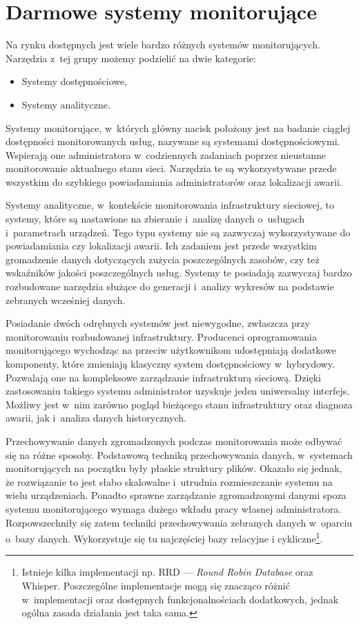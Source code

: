 \chapter{Darmowe systemy monitorujące}
\label{chap:Systemy}

Na rynku dostępnych jest wiele bardzo różnych systemów
monitorujących. Narzędzia z~tej grupy możemy podzielić na dwie
kategorie:

\begin{itemize}
\item Systemy dostępnościowe,
\item Systemy analityczne.
\end{itemize}

Systemy monitorujące, w~których główny nacisk położony jest na badanie
ciągłej dostępności monitorowanych usług, nazywane są systemami
dostępnościowymi. Wspierają one administratora w~codziennych zadaniach
poprzez nieustanne monitorowanie aktualnego stanu sieci. Narzędzia te
są wykorzystywane przede wszystkim do szybkiego powiadamiania
administratorów oraz lokalizacji awarii.

Systemy analityczne, w~kontekście monitorowania infrastruktury
sieciowej, to systemy, które są nastawione na zbieranie i~analizę
danych o~usługach i~parametrach urządzeń. Tego typu systemy nie są
zazwyczaj wykorzystywane do powiadamiania czy lokalizacji awarii. Ich
zadaniem jest przede wszystkim gromadzenie danych dotyczących zużycia
poszczególnych zasobów, czy też wskaźników jakości poszczególnych
usług. Systemy te posiadają zazwyczaj bardzo rozbudowane narzędzia
służące do generacji i~analizy wykresów na podstawie zebranych
wcześniej danych.

Posiadanie dwóch odrębnych systemów jest niewygodne, zwłaszcza przy
monitorowaniu rozbudowanej infrastruktury. Producenci oprogramowania
monitorującego wychodząc na przeciw użytkownikom udostępniają
dodatkowe komponenty, które zmieniają klasyczny system dostępnościowy
w~hybrydowy. Pozwalają one na kompleksowe zarządzanie infrastrukturą
sieciową. Dzięki zastosowaniu takiego systemu administrator uzyskuje
jeden uniwersalny interfejs. Możliwy jest w~nim zarówno pogląd
bieżącego stanu infrastruktury oraz diagnoza awarii, jak i~analiza
danych historycznych.

Przechowywanie danych zgromadzonych podczas monitorowania może odbywać
się na różne sposoby. Podstawową techniką przechowywania danych,
w~systemach monitorujących na początku były płaskie struktury
plików. Okazało się jednak, że rozwiązanie to jest słabo skalowalne
i~utrudnia rozmieszczanie systemu na wielu urządzeniach. Ponadto
sprawne zarządzanie zgromadzonymi danymi spoza systemu monitorującego
wymaga dużego wkładu pracy własnej administratora. Rozpowszechniły się
zatem techniki przechowywania zebranych danych w~oparciu o~bazy
danych. Wykorzystuje się tu najczęściej bazy relacyjne i
cykliczne\footnote{ Istnieje kilka implementacji np. RRD --- {\em
    Round Robin Database}\cite{www:RRDtool} oraz
  Whisper\cite{www:Whisper}. Poszczególne implementacje mogą się
  znacząco różnić w~implementacji oraz dostępnych funkcjonalnościach
  dodatkowych, jednak ogólna zasada działania jest taka sama.}.

